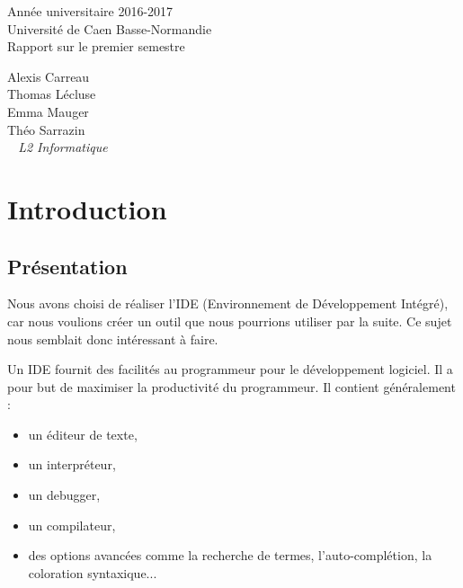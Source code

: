 \documentclass[a4paper,12pt]{article}
\begin{document}
\begin{titlepage}
	\begin{center}
		\Large{Année universitaire 2016-2017}\\
		\Large{Université de Caen Basse-Normandie}\\[1cm]
		
		\huge{Rapport sur le premier semestre}\\
		\vspace{3cm}
		
		Alexis Carreau\\
		Thomas Lécluse\\
		Emma Mauger\\
		Théo Sarrazin\\
		
	\normalsize{\textit{ ~ L2 Informatique}}\\
		\medskip
		\vspace{2cm}
		
	\end{center}
\end{titlepage}

\tableofcontents
\newpage

\section{Introduction}

	\subsection{Présentation}
	Nous avons choisi de réaliser l'IDE (Environnement de Développement Intégré), car nous voulions créer un outil que nous pourrions utiliser par la suite. Ce sujet nous semblait donc intéressant à faire.
	
	Un IDE fournit des facilités au programmeur pour le développement logiciel. Il a pour but de maximiser la productivité du programmeur. Il contient généralement :
	\begin{itemize}
		\item un éditeur de texte, 
		\item un interpréteur, 
		\item un debugger,
		\item un compilateur,
		\item des options avancées comme la recherche de termes, l'auto-complétion, la coloration syntaxique...
	\end{itemize}
	
\end{document}
